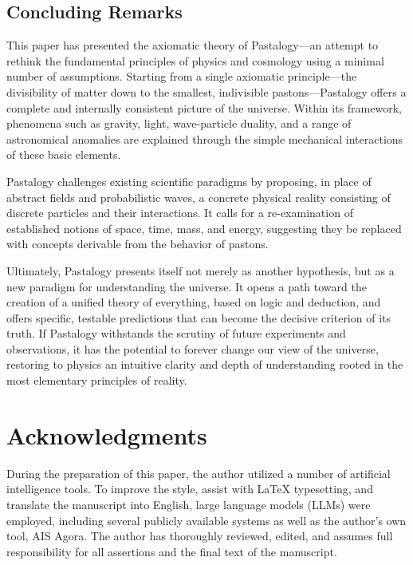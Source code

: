 \documentclass[pdflatex,sn-mathphys-num,referee]{sn-jnl}
\begin{document}
\subsection{Concluding Remarks}\label{subsec:conclusion}

This paper has presented the axiomatic theory of Pastalogy---an attempt to rethink the fundamental principles of physics and cosmology using a minimal number of assumptions. Starting from a single axiomatic principle---the divisibility of matter down to the smallest, indivisible pastons---Pastalogy offers a complete and internally consistent picture of the universe. Within its framework, phenomena such as gravity, light, wave-particle duality, and a range of astronomical anomalies are explained through the simple mechanical interactions of these basic elements.

Pastalogy challenges existing scientific paradigms by proposing, in place of abstract fields and probabilistic waves, a concrete physical reality consisting of discrete particles and their interactions. It calls for a re-examination of established notions of space, time, mass, and energy, suggesting they be replaced with concepts derivable from the behavior of pastons.

Ultimately, Pastalogy presents itself not merely as another hypothesis, but as a new paradigm for understanding the universe. It opens a path toward the creation of a unified theory of everything, based on logic and deduction, and offers specific, testable predictions that can become the decisive criterion of its truth. If Pastalogy withstands the scrutiny of future experiments and observations, it has the potential to forever change our view of the universe, restoring to physics an intuitive clarity and depth of understanding rooted in the most elementary principles of reality.

\backmatter

\section*{Acknowledgments}\label{sec:acknowledgements}

During the preparation of this paper, the author utilized a number of artificial intelligence tools. To improve the style, assist with LaTeX typesetting, and translate the manuscript into English, large language models (LLMs) were employed, including several publicly available systems as well as the author's own tool, AIS Agora. The author has thoroughly reviewed, edited, and assumes full responsibility for all assertions and the final text of the manuscript.
\end{document}
